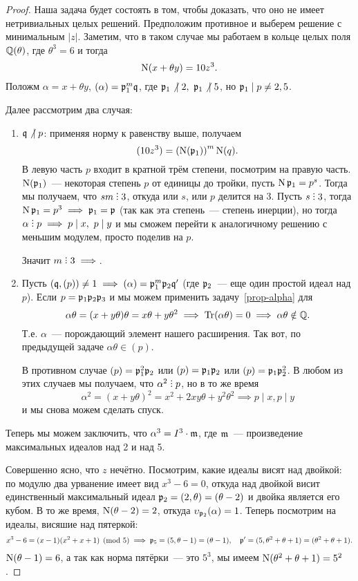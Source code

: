 \begin{proof}
	  	Наша задача будет состоять в том, чтобы доказать, что оно не имеет нетривиальных целых решений. Предположим противное и выберем решение с минимальным $|z|$. Заметим, что в таком случае мы работаем в кольце целых поля $\Q(\theta)$, где $\theta^3 = 6$ и тогда 
	  	\[
	  		\Nm(x + \theta y) = 10z^3.
	  	\]
	  	Положм $\alpha = x + \theta y$, $(\alpha) = \fp_1^m \fq$, где $\fp_1 \not\ \mid 2, \ \fp_1 \not\ \mid 5$, но $\fp_1 \mid p \neq 2, 5$.

	  	Далее рассмотрим два случая:

	  	\begin{enumerate}
	  		\item $\fq \not\ \mid p$: применяя норму к равенству выше, получаем 
	  		\[
	  			(10z^3) = \lr*{\Nm(\fp_1)}^m \Nm(q).
	  		\]
	  		В левую часть $p$ входит в кратной трём степени, посмотрим на правую часть. $\Nm(\fp_1)$~--- некоторая степень $p$ от единицы до тройки, пусть $\Nm{\fp_{1}} = p^s$. Тогда мы получаем, что $sm \divby 3$, откуда или $s$, или $p$ делится на 3. Пусть $s \divby 3$, тогда $\Nm{\fp_{1}} = p^3 \implies \fp_{1} = \fp$ (так как эта степень~---  степень инерции), но тогда $\alpha \divby p \implies p \mid x, \ p \mid y$ и мы сможем перейти к аналогичному решению с меньшим модулем, просто поделив на $p$. 

	  		Значит $m \divby 3 \implies$. 

	  		\item Пусть $(\fq, (p)) \neq 1 \implies (\alpha) = \fp_{1}^m \fp_{2} \fq'$ (где $\fp_{2}$~--- еще один простой идеал над $p$). Если $p = \fp_1 \fp_2 \fp_3$ и мы можем применить задачу~\ref{prop-alpha} для 
	  		\[
	  		 	\alpha\theta = (x + y\theta)\theta = x\theta + y\theta^2 \implies \Tr(\alpha\theta) = 0 \implies \alpha\theta \notin \Q.
	  		 \] 
	  		 Т.е. $\alpha$~--- порождающий элемент нашего расширения. Так вот, по предыдущей задаче $\alpha \theta \in (p)$.

	  		 В противном случае $(p) = \fp_1^2 \fp_2$ или $(p) = \fp_1 \fp_2$ или $(p) = \fp_1 \fp_2^2$. В любом из этих случаев мы получаем, что $\alpha^2 \divby p$, но в то же время 
	  		 \[
	  		 	\alpha^2  = (x + y\theta)^2 = x^2 + 2xy\theta + y^2\theta^2 \implies p \mid x, p \mid y
	  		 \]
	  		 и мы снова можем сделать спуск. 
	  	\end{enumerate}
	  	
	  	Теперь мы можем заключить, что $\alpha^3 = I^3 \cdot \fm$, где $\fm$~--- произведение максимальных идеалов над 2 и над 5.  

	  	Совершенно ясно, что $z$ нечётно. Посмотрим, какие идеалы висят над двойкой: по модулю два урванение имеет вид $x^3 - 6 = 0$, откуда над двойкой висит единственный максимальный идеал $\fp_{2} = (2, \theta) = (\theta - 2)$ и двойка является его кубом. В то же время, $\Nm(\theta - 2) = 2$, откуда  $\v_{\fp_{2}}(\alpha)= 1$. Теперь посмотрим на идеалы, висяшие над пятеркой: 
	  	\[
	  		x^3 - 6 = (x - 1)(x^2 + x + 1) \pmod{5} \implies \fp_{5} = (5, \theta - 1) = (\theta - 1), \quad \fp' = (5, \theta^2 + \theta + 1) = (\theta^2 + \theta + 1).
	  	\]
	  	$\Nm(\theta - 1) = 6$, а так как норма пятёрки~--- это $5^3$, мы имеем $\Nm(\theta^2 + \theta + 1) = 5^2$. 


\end{proof}
